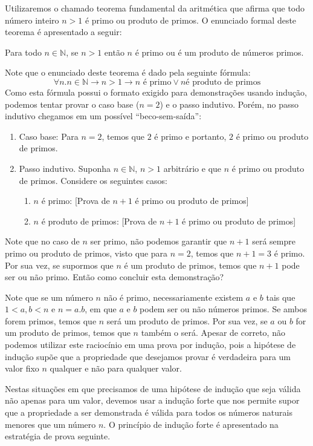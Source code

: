 Utilizaremos o chamado teorema fundamental da aritmética que afirma
que todo número inteiro $n > 1$ é primo ou produto de primos. O
enunciado formal deste teorema é apresentado a seguir:

\begin{Theorem}\label{strong-ind1}
Para todo $n\in\mathbb{N}$, se $n > 1$ então $n$ é primo ou é um
produto de números primos.
\end{Theorem}

Note que o enunciado deste teorema é dado pela seguinte fórmula:
\[
\forall n. n\in\mathbb{N} \to n > 1 \to n\text{ é primo} \lor n\text{
  é produto de primos}
\]
Como esta fórmula possui o formato exigido para demonstrações
usando indução, podemos tentar provar o caso base ($n = 2$) e o passo
indutivo. Porém, no passo indutivo chegamos em um possível ``beco-sem-saída'':
\begin{enumerate}
  \item[\ ]Caso base: Para $n = 2$, temos que $2$ é primo e portanto,
    $2$ é primo ou produto de primos.
  \item[\ ]Passo indutivo. Suponha $n\in\mathbb{N}$, $n > 1$
    arbitrário e que $n$ é primo ou produto de primos. Considere os
    seguintes casos:
    \begin{enumerate}
      \item[\ ] $n$ é primo: [Prova de $n + 1$ é primo ou produto de primos]
      \item[\ ] $n$ é produto de primos: [Prova de $n + 1$ é primo ou produto de primos]
    \end{enumerate}
\end{enumerate}
Note que no caso de $n$ ser primo, não podemos garantir que $n + 1$
será sempre primo ou produto de primos, visto que para $n = 2$, temos
que $n + 1 = 3$ é primo. Por sua vez, se supormos que $n$ é um produto
de primos, temos que $n + 1$ pode ser ou não primo. Então como
concluir esta demonstração?

Note que se um número $n$ não é primo, necessariamente existem $a$ e
$b$ tais que $1 < a,b < n$ e $n = a.b$, em que $a$ e $b$ podem ser ou
não números primos. Se ambos forem primos, temos que $n$ será um
produto de primos. Por sua vez, se  $a$ ou $b$ for um produto de
primos, temos que $n$ também o será. Apesar de correto, não podemos
utilizar este raciocínio em uma prova por indução, pois a hipótese de
indução supõe que a propriedade que desejamos provar é verdadeira para
um valor fixo $n$ qualquer e não para qualquer valor.

Nestas situações em que precisamos de uma hipótese de indução que seja
válida não apenas para um valor, devemos usar a indução forte que nos
permite supor que a propriedade a ser demonstrada é válida para todos
os números naturais menores que um número $n$. O princípio de indução
forte é apresentado na estratégia de prova seguinte.

